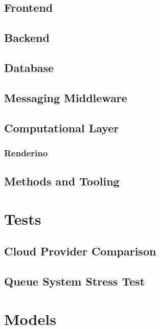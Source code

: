 \documentclass{Configuration_Files/PoliMi3i_thesis}
\begin{document}
		\section{Frontend}
		\label{se:frontend}

		\section{Backend}
		\label{se:backend}

		\section{Database}
		\label{se:database}

		\section{Messaging Middleware}
		\label{se:mom}

		\section{Computational Layer}
		\label{se:complayer}
			
			\subsection{Renderino}
			\label{sse:renderino}

    \section{Methods and Tooling}
    \label{se:methodsandtooling}

  \appendix

  \chapter{Tests}
    \section{Cloud Provider Comparison}
    \label{ap:cloudcomparison}

    \section{Queue System Stress Test}
    \label{ap:rmqtests}

  \chapter{Models}
\end{document}
